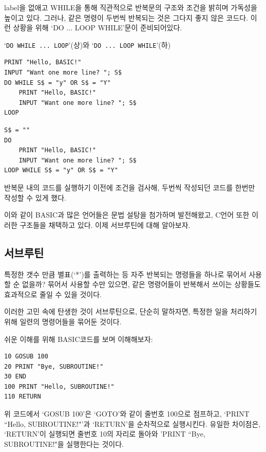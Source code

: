 \documentclass[a4paper,12pt]{book}
\newcommand{\V}[1]{\Verb|#1|}
\newcommand*{\fullref}[1]{\autoref{#1} (\nameref*{#1})}
\begin{document}
label을 없애고 WHILE을 통해 직관적으로 반복문의 구조와 조건을 밝히며 가독성을 높이고 있다.
그러나, 같은 명령이 두번씩 반복되는 것은 그다지 좋지 않은 코드다.
이런 상황을 위해 `DO ... LOOP WHILE'문이 준비되어있다.



\begin{center}
    \centering

    `\V{DO WHILE ... LOOP}'(상)와 `\V{DO ... LOOP WHILE}'(하)

\begin{lstlisting}
PRINT "Hello, BASIC!"
INPUT "Want one more line? "; S$
DO WHILE S$ = "y" OR S$ = "Y"
    PRINT "Hello, BASIC!"
    INPUT "Want one more line? "; S$
LOOP
\end{lstlisting}
\begin{lstlisting}
S$ = ""
DO
    PRINT "Hello, BASIC!"
    INPUT "Want one more line? "; S$
LOOP WHILE S$ = "y" OR S$ = "Y"
\end{lstlisting}

\end{center}

반복문 내의 코드를 실행하기 이전에 조건을 검사해, 두번씩 작성되던 코드를 한번만 작성할 수 있게 했다.

이와 같이 BASIC과 많은 언어들은 문법 설탕을 첨가하며 발전해왔고, C언어 또한 이러한 구조들을 채택하고 있다.
이제 서브루틴에 대해 알아보자.


\subsection{서브루틴}

특정한 갯수 만큼 별표(`*')를 출력하는 등 자주 반복되는 명령들을 하나로 묶어서 사용할 순 없을까?
묶어서 사용할 수만 있으면, 같은 명령어들이 반복해서 쓰이는 상황들도 효과적으로 줄일 수 있을 것이다.

이러한 고민 속에 탄생한 것이 서브루틴으로,
단순히 말하자면, 특정한 일을 처리하기 위해 일련의 명령어들을 묶어둔 것이다.

쉬운 이해를 위해 BASIC코드를 보며 이해해보자:

\begin{lstlisting}
10 GOSUB 100
20 PRINT "Bye, SUBROUTINE!"
30 END
100 PRINT "Hello, SUBROUTINE!"
110 RETURN
\end{lstlisting}

위 코드에서 `GOSUB 100'은 `GOTO'와 같이 줄번호 100으로 점프하고,
`PRINT ``Hello, SUBROUTINE!"'과 `RETURN'을 순차적으로 실행시킨다.
유일한 차이점은, `RETURN'이 실행되면 줄번호 10의 자리로 돌아와
'PRINT ``Bye, SUBROUTINE!"을 실행한다는 것이다.
\end{document}
